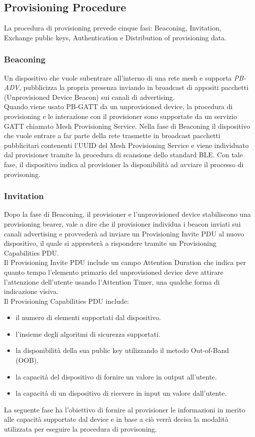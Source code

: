 \subsection{Provisioning Procedure}
La procedura di provisioning prevede cinque fasi: Beaconing, Invitation, Exchange public keys, Authentication e Distribution of provisioning data.

\subsubsection{Beaconing}
Un dispositivo che vuole subentrare all'interno di una rete mesh e supporta \textit{PB-ADV}, pubblicizza la propria presenza inviando in broadcast di appositi pacchetti (Unprovisioned Device Beacon) sui canali di advertising.\\
Quando viene usato PB-GATT da un unprovisioned device, la procedura di provisioning e le interazione con il provisioner sono supportate da un servizio GATT chiamato Mesh Provisioning Service. Nella fase di Beaconing il dispositivo che vuole entrare a far parte della rete trasmette in broadcast pacchetti pubblicitari contenenti l'UUID del Mesh Provisioning Service e viene individuato dal provisioner tramite la procedura di scansione dello standard BLE. 
Con tale fase, il dispositivo indica al provisioner la disponibilità ad avviare il processo di provisoning.

\subsubsection{Invitation}
Dopo la fase di Beaconing, il provisioner e l'unprovisioned device stabiliscono una provisioning bearer, vale a dire che il provisioner individua i beacon inviati sui canali advertising e provvederà ad inviare un Provisioning Invite PDU al nuovo dispositivo, il quale si appresterà a rispondere tramite un Provisioning Capabilities PDU.\\
Il Provisioning Invite PDU include un campo Attention Duration che indica per quanto tempo l'elemento primario del unprovisioned device deve attirare l'attenzione dell'utente usando l'Attention Timer, una qualche forma di indicazione visiva.\\
Il Provisioning Capabilities PDU include:
\begin{itemize}
    \item il numero di elementi supportati dal dispositivo.
    \item l'insieme degli algoritmi di sicurezza supportati.
    \item la disponibilità della sua public key utilizzando il metodo Out-of-Band (OOB).
    \item la capacità del dispositivo di fornire un valore in output all'utente.
    \item la capacità di un dispositivo di ricevere in input un valore dall'utente.
\end{itemize}
\noindent La seguente fase ha l'obiettivo di fornire al provisioner le informazioni in merito alle capacità supportate dal device e in base a ciò verrà decisa la modalità utilizzata per eseguire la procedura di provisoning.

